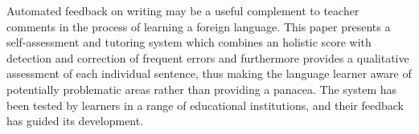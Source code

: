Automated feedback on writing may be a useful complement to teacher comments in the process of learning a foreign language. This paper presents a
 self-assessment and tutoring system which combines an holistic score with
 detection and correction of frequent errors and furthermore provides a
 qualitative assessment of each individual sentence, thus making the language
 learner aware of potentially problematic areas rather than providing a panacea.
 The system has been tested by learners in a range of educational institutions,
 and their feedback has guided its development.

